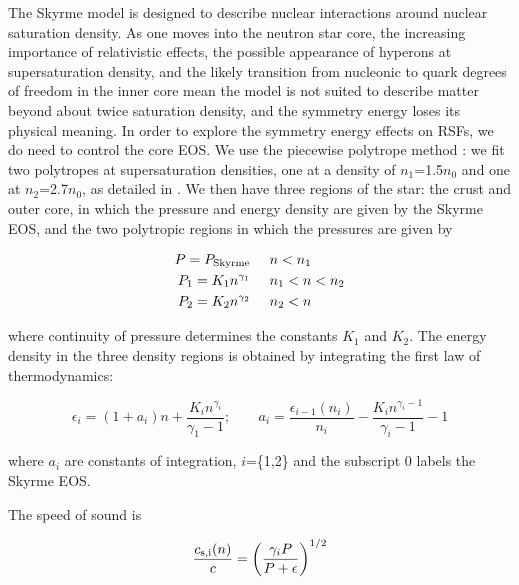 \documentclass[fleqn,usenatbib]{mnras}
\begin{document}
The Skyrme model is designed to describe nuclear interactions around nuclear saturation density. As one moves into the neutron star core, the increasing importance of relativistic effects, the possible appearance of hyperons at supersaturation density, and the likely transition from nucleonic to quark degrees of freedom in the inner core mean the model is not suited to describe matter beyond about twice saturation density, and the symmetry energy loses its physical meaning. In order to explore the symmetry energy effects on RSFs, we do need to control the core EOS. We use the piecewise polytrope method \citep{Read:2009aa, Read:2009ab, Steiner:2010aa, Steiner:2013aa, Ozel:2009aa, Ozel:2010aa, Ozel:2016aa}: we fit two polytropes at supersaturation densities, one at a density of $n_1$=1.5$n_0$ and one at $n_2$=2.7$n_0$, as detailed in \cite{Newton:2018aa}. We then have three regions of the star: the crust and outer core, in which the pressure and energy density are given by the Skyrme EOS, and the two polytropic regions in which the pressures are given by

\begin{align}
\nonumber P = P_{\rm Skyrme} & \;\;\;\;\; n<n_1 \\
\nonumber P_1 = K_1 n^{\gamma_1}  & \;\;\;\;\;n_1 <n<n_2  \\
P_2 = K_2 n^{\gamma_2} & \;\;\;\;\;  n_2 < n
\end{align}


\noindent where continuity of pressure determines the constants $K_1$ and $K_2$. The energy density in the three density regions is obtained by integrating the first law of thermodynamics:

\begin{equation}
\epsilon_i = (1+a_i)n + \frac{K_i n^{\gamma_i}}{\gamma_1 -1}; \;\;\;\;\;\;\; a_i = \frac{\epsilon_{i-1} (n_i)}{n_i} - \frac{K_i n^{\gamma_i - 1}}{\gamma_i -1} - 1
\end{equation}

\noindent where $a_i$ are constants of integration, $i$=\{1,2\} and the subscript 0 labels the Skyrme EOS.

The speed of sound is 

\begin{equation}
\frac{c_{\rm s,i}(n)}{c} = \bigg( \frac{\gamma_i P}{P + \epsilon}\bigg)^{1/2}
\end{equation}
\end{document}

